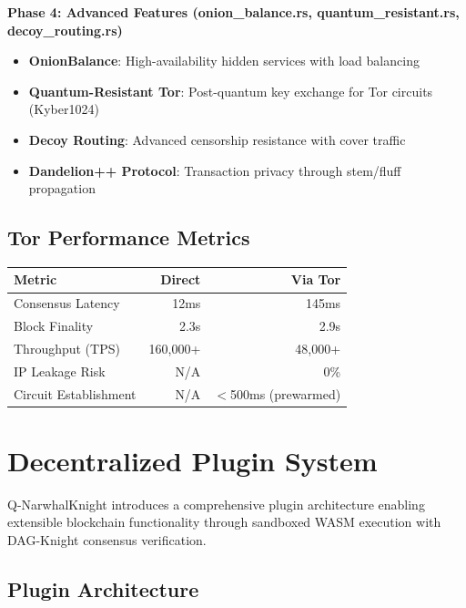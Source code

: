 \documentclass[12pt,a4paper]{article}
\begin{document}
\begin{statbox}
\textbf{Phase 4: Advanced Features (onion\_balance.rs, quantum\_resistant.rs, decoy\_routing.rs)}

\begin{itemize}
    \item \textbf{OnionBalance}: High-availability hidden services with load balancing
    \item \textbf{Quantum-Resistant Tor}: Post-quantum key exchange for Tor circuits (Kyber1024)
    \item \textbf{Decoy Routing}: Advanced censorship resistance with cover traffic
    \item \textbf{Dandelion++ Protocol}: Transaction privacy through stem/fluff propagation
\end{itemize}
\end{statbox}

\subsection{Tor Performance Metrics}

\begin{center}
\begin{tabular}{@{}lrr@{}}
\toprule
\textbf{Metric} & \textbf{Direct} & \textbf{Via Tor} \\
\midrule
Consensus Latency & 12ms & 145ms \\
Block Finality & 2.3s & 2.9s \\
Throughput (TPS) & 160,000+ & 48,000+ \\
IP Leakage Risk & N/A & 0\% \\
Circuit Establishment & N/A & $<$500ms (prewarmed) \\
\bottomrule
\end{tabular}
\end{center}

\section{Decentralized Plugin System}

Q-NarwhalKnight introduces a comprehensive plugin architecture enabling extensible blockchain functionality through sandboxed WASM execution with DAG-Knight consensus verification.

\subsection{Plugin Architecture}
\end{document}
